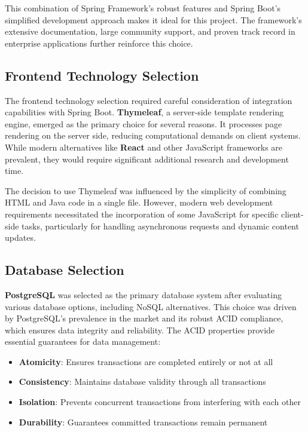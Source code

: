 This combination of Spring Framework's robust features and Spring Boot's simplified development approach makes it ideal for this project.
The framework's extensive documentation, large community support, and proven track record in enterprise applications further reinforce this choice.

\subsection{Frontend Technology Selection}\label{subsec:frontend-selection}

The frontend technology selection required careful consideration of integration capabilities with Spring Boot.
\textbf{Thymeleaf}, a server-side template rendering engine, emerged as the primary choice for several reasons.
It processes page rendering on the server side, reducing computational demands on client systems.
While modern alternatives like \textbf{React} and other JavaScript frameworks are prevalent, they would require significant additional research and development time.

The decision to use Thymeleaf was influenced by the simplicity of combining HTML and Java code in a single file.
However, modern web development requirements necessitated the incorporation of some JavaScript for specific client-side tasks, particularly for handling asynchronous requests and dynamic content updates.

\subsection{Database Selection}\label{subsec:database-selection}

\textbf{PostgreSQL} was selected as the primary database system after evaluating various database options, including NoSQL alternatives.
This choice was driven by PostgreSQL's prevalence in the market and its robust ACID compliance, which ensures data integrity and reliability.
The ACID properties provide essential guarantees for data management:

\begin{itemize}
    \item \textbf{Atomicity}: Ensures transactions are completed entirely or not at all
    \item \textbf{Consistency}: Maintains database validity through all transactions
    \item \textbf{Isolation}: Prevents concurrent transactions from interfering with each other
    \item \textbf{Durability}: Guarantees committed transactions remain permanent
\end{itemize}

